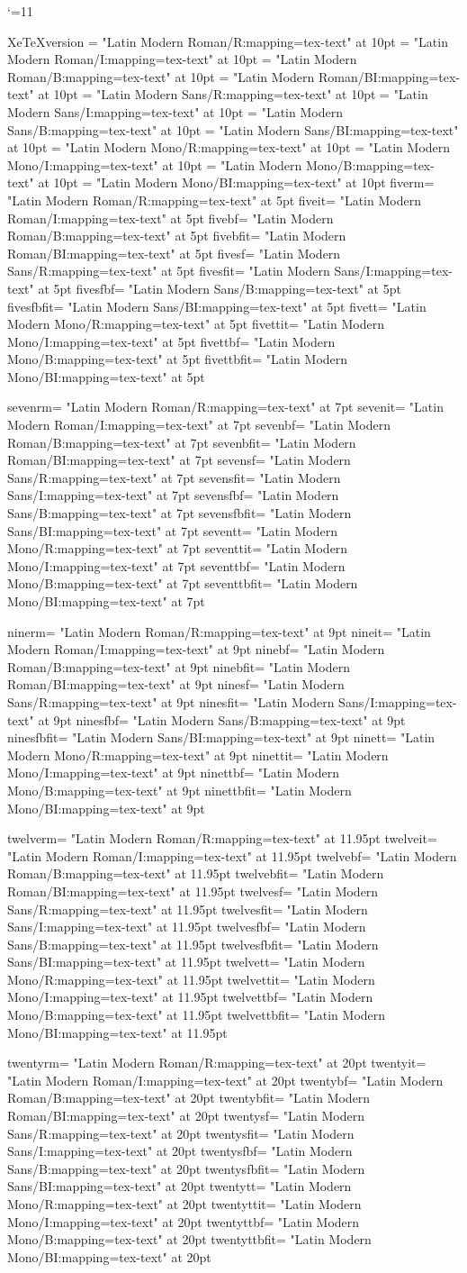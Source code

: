 \catcode`\@=11

\ifdefined\mainfontname\else
  \gdef\mainfontname{Latin Modern Roman}
\fi
\ifdefined\sansfontname\else
  \gdef\sansfontname{Latin Modern Sans}
\fi
\ifdefined\monofontname\else
  \gdef\monofontname{Latin Modern Mono}
\fi
\ifdefined\mathfontname\else
  \gdef\mathfontname{Latin Modern Math}
\fi
\ifcsname XeTeXversion\endcsname
  \ifdefined\textfontopt\else
    \def\textfontopt{mapping=tex-text}
  \fi
\else
\fi
\font\tenrm     =  "\mainfontname/R:\textfontopt" at 10pt
\font\tenit     =  "\mainfontname/I:\textfontopt" at 10pt
\font\tenbf     =  "\mainfontname/B:\textfontopt" at 10pt
\font\tenbfit   = "\mainfontname/BI:\textfontopt" at 10pt
\font\tensf     =  "\sansfontname/R:\textfontopt" at 10pt
\font\tensfit   =  "\sansfontname/I:\textfontopt" at 10pt
\font\tensfbf   =  "\sansfontname/B:\textfontopt" at 10pt
\font\tensfbfit = "\sansfontname/BI:\textfontopt" at 10pt
\font\tentt     =  "\monofontname/R:\textfontopt" at 10pt
\font\tenttit   =  "\monofontname/I:\textfontopt" at 10pt
\font\tenttbf   =  "\monofontname/B:\textfontopt" at 10pt
\font\tenttbfit = "\monofontname/BI:\textfontopt" at 10pt
\def\genfontcmds#1#2{%
  \expandafter\font\csname     #1rm\endcsname =  "\mainfontname/R:\textfontopt" at #2
  \expandafter\font\csname     #1it\endcsname =  "\mainfontname/I:\textfontopt" at #2
  \expandafter\font\csname     #1bf\endcsname =  "\mainfontname/B:\textfontopt" at #2
  \expandafter\font\csname   #1bfit\endcsname = "\mainfontname/BI:\textfontopt" at #2
  \expandafter\font\csname     #1sf\endcsname =  "\sansfontname/R:\textfontopt" at #2
  \expandafter\font\csname   #1sfit\endcsname =  "\sansfontname/I:\textfontopt" at #2
  \expandafter\font\csname   #1sfbf\endcsname =  "\sansfontname/B:\textfontopt" at #2
  \expandafter\font\csname #1sfbfit\endcsname = "\sansfontname/BI:\textfontopt" at #2
  \expandafter\font\csname     #1tt\endcsname =  "\monofontname/R:\textfontopt" at #2
  \expandafter\font\csname   #1ttit\endcsname =  "\monofontname/I:\textfontopt" at #2
  \expandafter\font\csname   #1ttbf\endcsname =  "\monofontname/B:\textfontopt" at #2
  \expandafter\font\csname #1ttbfit\endcsname = "\monofontname/BI:\textfontopt" at #2
}
\genfontcmds{five}{5pt}
\genfontcmds{seven}{7pt}
\genfontcmds{nine}{9pt}
\genfontcmds{twelve}{11.95pt}
\genfontcmds{twenty}{20pt}
